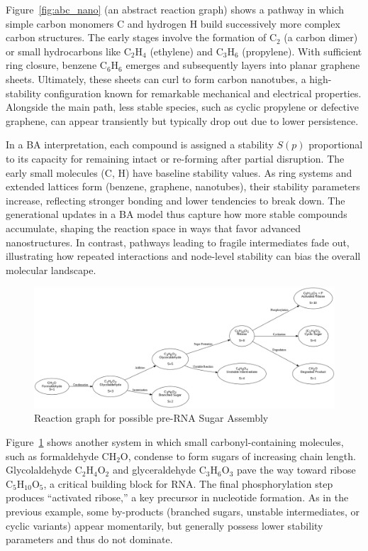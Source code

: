 \documentclass[entropy,article,submit,pdftex,moreauthors]{Definitions/mdpi}
\begin{document}
Figure~\ref{fig:abc_nano} (an abstract reaction graph) shows a pathway in which simple carbon monomers C and hydrogen H build successively more complex carbon structures. The early stages involve the formation of C$_2$ (a carbon dimer) or small hydrocarbons like C$_2$H$_4$ (ethylene) and C$_3$H$_6$ (propylene). With sufficient ring closure, benzene C$_6$H$_6$ emerges and subsequently layers into planar graphene sheets. Ultimately, these sheets can curl to form carbon nanotubes, a high-stability configuration known for remarkable mechanical and electrical properties. Alongside the main path, less stable species, such as cyclic propylene or defective graphene, can appear transiently but typically drop out due to lower persistence.

In a BA interpretation, each compound is assigned a stability $S(p)$ proportional to its capacity for remaining intact or re-forming after partial disruption. The early small molecules (C, H) have baseline stability values. As ring systems and extended lattices form (benzene, graphene, nanotubes), their stability parameters increase, reflecting stronger bonding and lower tendencies to break down. The generational updates in a BA model thus capture how more stable compounds accumulate, shaping the reaction space in ways that favor advanced nanostructures. In contrast, pathways leading to fragile intermediates fade out, illustrating how repeated interactions and node-level stability can bias the overall molecular landscape.

\begin{figure}[h]
    \centering
    \includegraphics[width=1\textwidth]{abc_prerna.png}
    \caption{Reaction graph for possible pre-RNA Sugar Assembly}
    \label{fig:abc_prerna}
\end{figure}

Figure~\ref{fig:abc_prerna} shows another system in which small carbonyl-containing molecules, such as formaldehyde CH$_2$O, condense to form sugars of increasing chain length. Glycolaldehyde C$_2$H$_4$O$_2$ and glyceraldehyde C$_3$H$_6$O$_3$ pave the way toward ribose C$_5$H$_{10}$O$_5$, a critical building block for RNA. The final phosphorylation step produces ``activated ribose,'' a key precursor in nucleotide formation. As in the previous example, some by-products (branched sugars, unstable intermediates, or cyclic variants) appear momentarily, but generally possess lower stability parameters and thus do not dominate.
\end{document}
